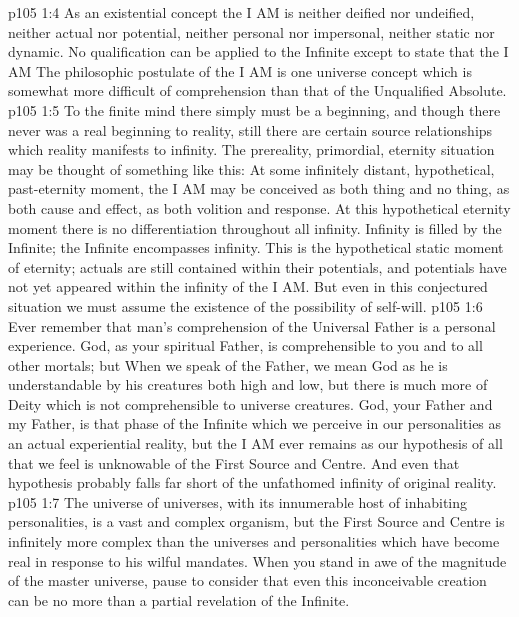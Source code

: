 \vs p105 1:4 As an existential concept the I AM is neither deified nor undeified, neither actual nor potential, neither personal nor impersonal, neither static nor dynamic. No qualification can be applied to the Infinite except to state that the I AM  The philosophic postulate of the I AM is one universe concept which is somewhat more difficult of comprehension than that of the Unqualified Absolute.
\vs p105 1:5 To the finite mind there simply must be a beginning, and though there never was a real beginning to reality, still there are certain source relationships which reality manifests to infinity. The prereality, primordial, eternity situation may be thought of something like this: At some infinitely distant, hypothetical, past\hyp{}eternity moment, the I AM may be conceived as both thing and no thing, as both cause and effect, as both volition and response. At this hypothetical eternity moment there is no differentiation throughout all infinity. Infinity is filled by the Infinite; the Infinite encompasses infinity. This is the hypothetical static moment of eternity; actuals are still contained within their potentials, and potentials have not yet appeared within the infinity of the I AM. But even in this conjectured situation we must assume the existence of the possibility of self\hyp{}will.
\vs p105 1:6 \pc Ever remember that man’s comprehension of the Universal Father is a personal experience. God, as your spiritual Father, is comprehensible to you and to all other mortals; but  When we speak of the Father, we mean God as he is understandable by his creatures both high and low, but there is much more of Deity which is not comprehensible to universe creatures. God, your Father and my Father, is that phase of the Infinite which we perceive in our personalities as an actual experiential reality, but the I AM ever remains as our hypothesis of all that we feel is unknowable of the First Source and Centre. And even that hypothesis probably falls far short of the unfathomed infinity of original reality.
\vs p105 1:7 The universe of universes, with its innumerable host of inhabiting personalities, is a vast and complex organism, but the First Source and Centre is infinitely more complex than the universes and personalities which have become real in response to his wilful mandates. When you stand in awe of the magnitude of the master universe, pause to consider that even this inconceivable creation can be no more than a partial revelation of the Infinite.

